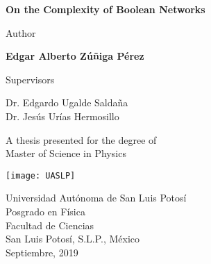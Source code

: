 \begin{titlepage}
	\begin{center}
		\vspace*{1cm}
		
		\Huge
		\textbf{On the Complexity of Boolean Networks\\}
		\vspace{1cm}
		\LARGE
		
		Author
		
		\vspace{0.3cm}
		
		\textbf{Edgar Alberto Zúñiga Pérez}
		
		\vspace{1cm}
		\large
		Supervisors
		
		\vspace{0.2cm}
		
		Dr. Edgardo Ugalde Saldaña\\
		Dr. Jesús Urías Hermosillo
		
		
		\vfill
		
		A thesis presented for the degree of\\
		Master of Science in Physics
		
		\vspace{0.8cm}
		
		\texttt{[image: UASLP]}
		
		\Large
		Universidad Autónoma de San Luis Potosí\\
		Posgrado en Física\\
		Facultad de Ciencias\\
		\large
		San Luis Potosí, S.L.P., México\\
		Septiembre, 2019
		
	\end{center}
\end{titlepage}